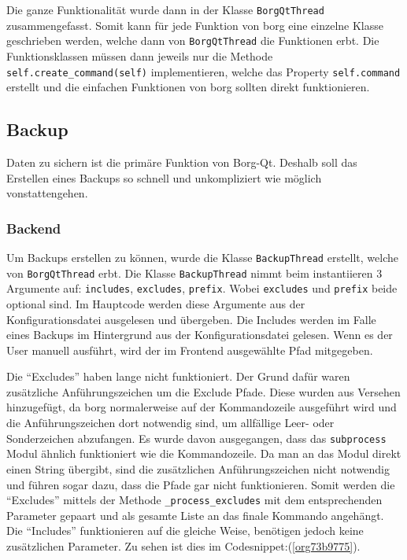 Die ganze Funktionalität wurde dann in der Klasse \texttt{BorgQtThread}
zusammengefasst. Somit kann für jede Funktion von \gls{borg} eine einzelne Klasse
geschrieben werden, welche dann von \texttt{BorgQtThread} die Funktionen erbt. Die
Funktionsklassen müssen dann jeweils nur die Methode
\texttt{self.create\_command(self)} implementieren, welche das Property \texttt{self.command}
erstellt und die einfachen Funktionen von \gls{borg} sollten direkt funktionieren.

\newpage
\subsection{Backup}
\label{sec:org89c69ff}

Daten zu sichern ist die primäre Funktion von Borg-Qt. Deshalb soll das
Erstellen eines Backups so schnell und unkompliziert wie möglich
vonstattengehen.

\subsubsection{Backend}
\label{sec:orgf0c2da8}

Um Backups erstellen zu können, wurde die Klasse \texttt{BackupThread}
erstellt, welche von \texttt{BorgQtThread} erbt. Die Klasse
\texttt{BackupThread} nimmt beim instantiieren 3 Argumente auf:
\texttt{includes}, \texttt{excludes}, \texttt{prefix}. Wobei \texttt{excludes}
und \texttt{prefix} beide optional sind. Im Hauptcode werden diese Argumente
aus der Konfigurationsdatei ausgelesen und übergeben. Die Includes werden im
Falle eines Backups im Hintergrund aus der Konfigurationsdatei gelesen. Wenn es
der User manuell ausführt, wird der im Frontend ausgewählte Pfad mitgegeben.

Die "`Excludes"' haben lange nicht funktioniert. Der Grund dafür waren
zusätzliche Anführungszeichen um die Exclude Pfade. Diese wurden aus Versehen
hinzugefügt, da \gls{borg} normalerweise auf der Kommandozeile ausgeführt wird
und die Anführungszeichen dort notwendig sind, um allfällige Leer- oder
Sonderzeichen abzufangen. Es wurde davon ausgegangen, dass das
\texttt{subprocess} Modul ähnlich funktioniert wie die Kommandozeile. Da man an
das Modul direkt einen String übergibt, sind die zusätzlichen Anführungszeichen
nicht notwendig und führen sogar dazu, dass die Pfade gar nicht funktionieren.\newpage
Somit werden die "`Excludes"' mittels der Methode \texttt{\_process\_excludes}
mit dem entsprechenden Parameter gepaart und als gesamte Liste an das finale
Kommando angehängt. Die "`Includes"' funktionieren auf die gleiche Weise,
benötigen jedoch keine zusätzlichen Parameter. Zu sehen ist dies im
Codesnippet:(\ref{org73b9775}).

